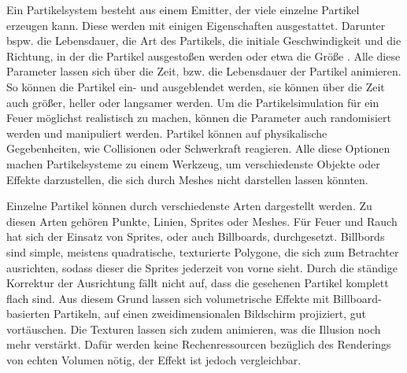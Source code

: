 Ein Partikelsystem besteht aus einem Emitter, der viele einzelne Partikel erzeugen kann. Diese werden mit einigen Eigenschaften ausgestattet. Darunter
bspw. die Lebensdauer, die Art des Partikels, die initiale Geschwindigkeit und die Richtung, in der die Partikel ausgestoßen werden oder etwa die Größe \parencite{Reeves1983}.
Alle diese Parameter lassen sich über die Zeit, bzw. die Lebensdauer der Partikel animieren. 
So können die Partikel ein- und ausgeblendet werden, sie können über die Zeit auch größer, heller oder langsamer werden. 
Um die Partikelsimulation für ein Feuer möglichst realistisch zu machen, können die Parameter auch randomisiert werden und manipuliert werden.
Partikel können auf physikalische Gegebenheiten, wie Collisionen oder Schwerkraft reagieren. Alle diese Optionen machen Partikelsysteme zu einem 
Werkzeug, um verschiedenste Objekte oder Effekte darzustellen, die sich durch Meshes nicht darstellen lassen könnten. 

Einzelne Partikel können durch verschiedenste Arten dargestellt werden. Zu diesen Arten gehören Punkte, Linien, Sprites oder Meshes.
Für Feuer und Rauch hat sich der Einsatz von Sprites, oder auch Billboards, durchgesetzt. Billbords sind simple, meistens quadratische, texturierte Polygone,
die sich zum Betrachter ausrichten, sodass dieser die Sprites jederzeit von vorne sieht. Durch die ständige Korrektur der Ausrichtung fällt
nicht auf, dass die gesehenen Partikel komplett flach sind. Aus diesem Grund lassen sich volumetrische Effekte mit Billboard-basierten Partikeln, 
auf einen zweidimensionalen Bildschirm projiziert, gut vortäuschen.  Die Texturen lassen sich zudem animieren, was die Illusion noch mehr verstärkt.  
Dafür werden keine Rechenressourcen bezüglich des Renderings von echten Volumen nötig, der Effekt ist jedoch vergleichbar.
